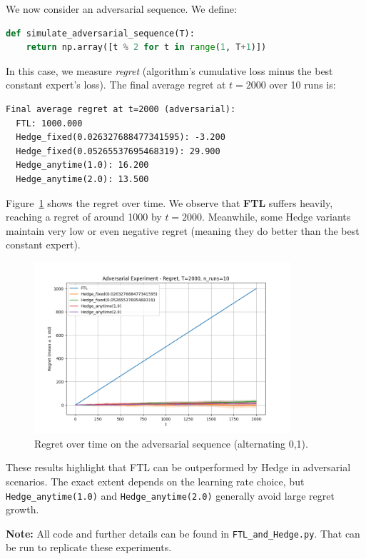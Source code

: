We now consider an adversarial sequence.  We define:

\begin{lstlisting}[language=Python, caption={Adversarial sequence alternating 0 and 1.}]
def simulate_adversarial_sequence(T):
    return np.array([t % 2 for t in range(1, T+1)])
\end{lstlisting}

In this case, we measure \emph{regret} (algorithm’s cumulative loss minus the best constant expert’s loss).  The final average regret at \(t=2000\) over 10 runs is:

\begin{verbatim}
Final average regret at t=2000 (adversarial):
  FTL: 1000.000
  Hedge_fixed(0.026327688477341595): -3.200
  Hedge_fixed(0.05265537695468319): 29.900
  Hedge_anytime(1.0): 16.200
  Hedge_anytime(2.0): 13.500
\end{verbatim}

\noindent
Figure~\ref{fig:plot_adversarial} shows the regret over time.  We observe that \textbf{FTL} suffers heavily, reaching a regret of around 1000 by \(t=2000\).  Meanwhile, some Hedge variants maintain very low or even negative regret (meaning they do better than the best constant expert).

\begin{figure}[H]
\centering
\includegraphics[width=0.85\textwidth]{Code/plot_adversarial_example.png}
\caption{Regret over time on the adversarial sequence (alternating 0,1).}
\label{fig:plot_adversarial}
\end{figure}

These results highlight that FTL can be outperformed by Hedge in adversarial scenarios.  The exact extent depends on the learning rate choice, but \texttt{Hedge\_anytime(1.0)} and \texttt{Hedge\_anytime(2.0)} generally avoid large regret growth.

\bigskip
\noindent
\textbf{Note:} All code and further details can be found in \texttt{FTL\_and\_Hedge.py}. That can be run to replicate these experiments.
